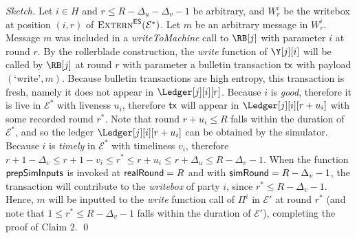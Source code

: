 \begin{proof}[Sketch]
  Let $i \in H$ and $r \leq R - \Delta_u - \Delta_v - 1$ be arbitrary, and $W^i_r$ be the writebox
  at position $(i, r)$ of $\textsc{Extern}^{\textsf{ES}}(\mathcal{E}^*)$. Let $m$ be an arbitrary message
  in $W^i_r$. Message $m$ was included in a \emph{writeToMachine} call to $\RB[j]$
  with parameter $i$ at round $r$. By the rollerblade construction, the \emph{write}
  function of $\Y[j][i]$ will be called by $\RB[j]$ at round $r$ with parameter a bulletin
  transaction $\textsf{tx}$ with payload $(\text{`write'}, m)$. Because bulletin transactions are high entropy,
  this transaction is fresh, namely it does not appear in $\Ledger[j][i][r]$.
  Because $i$ is \emph{good}, therefore it is live in $\mathcal{E}^*$ with liveness $u_i$,
  therefore $\textsf{tx}$ will appear in $\Ledger[j][i][r + u_i]$ with some recorded round $r^*$.
  Note that round $r + u_i \leq R$ falls within the duration of $\mathcal{E}^*$, and
  so the ledger $\Ledger[j][i][r + u_i]$ can be obtained by the simulator.
  Because $i$ is \emph{timely} in $\mathcal{E}^*$ with timeliness $v_i$, therefore
  $r + 1 - \Delta_v \leq r + 1 - v_i \leq r^* \leq r + u_i \leq r + \Delta_u \leq R - \Delta_v - 1$.
  When the function $\textsf{prepSimInputs}$ is invoked at $\textsf{realRound} = R$
  and with $\textsf{simRound} = R - \Delta_v - 1$, the transaction will contribute
  to the \emph{writebox} of party $i$, since $r^* \leq R - \Delta_v - 1$.
  Hence, $m$ will be inputted to the \emph{write} function call of $\Pi^i$
  in $\mathcal{E}'$ at round $r^*$ (and note that $1 \leq r^* \leq R - \Delta_v - 1$ falls
  within the duration of $\mathcal{E}'$), completing the proof of Claim 2.
  \qed
\end{proof}

